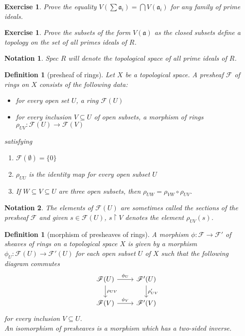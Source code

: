\documentclass[12pt]{article}
\newtheorem{definition}[proposition]{Definition}
\newtheorem{ex}[proposition]{Exercise}
\newtheorem{notation}{Notation}
\begin{document}
\begin{ex}
	Prove the equality $V(\sum \mathfrak{a}_i) = \bigcap V(\mathfrak{a}_i)$ for any family of prime ideals.
\end{ex}

\begin{ex}
	Prove the subsets of the form $V(\mathfrak{a})$ as the closed subsets define a topology on the set of all primes ideals of $R$. 
\end{ex}

\begin{notation}
	Spec $R$ will denote the topological space of all prime ideals of $R$.
\end{notation}

\begin{definition}[presheaf of rings]
	Let $X$ be a topological space. A presheaf $\mathscr{F}$ of rings on $X$ consists of the following data:
	\begin{itemize}
		\item for every open set $U$, a ring $\mathscr{F}(U)$
		\item for every inclusion $V \subseteq U$ of open subsets, a morphism of rings $\rho_{UV}: \mathscr{F}(U) \rightarrow \mathscr{F}(V)$  
	\end{itemize}
satisfying 
	\begin{enumerate}
		\item $\mathscr{F}(\emptyset) = \lbrace 0 \rbrace$
		\item $\rho_{UU}$ is the identity map for every open subset $U$
		\item  If $W \subseteq V \subseteq U$ are three open subsets, then $\rho_{UW} = \rho_{VW} \circ \rho_{UV}$.
	\end{enumerate}
\end{definition}

\begin{notation}
	The elements of $\mathscr{F}(U)$ are sometimes called the sections of the presheaf $\mathscr{F}$ and given $s \in \mathscr{F}(U)$, $s\restriction V$ denotes the element $\rho_{UV}(s)$.
\end{notation}

\begin{definition}[morphism of presheaves of rings]
	A morphism $\phi: \mathscr{F} \rightarrow \mathscr{F}'$ of sheaves of rings on a topological space $X$ is given by a morphism $\phi_U: \mathscr{F}(U) \rightarrow \mathscr{F}'(U)$ for each open subset $U$ of $X$ such that  the following diagram commutes
	\[
	\begin{tikzcd}
	\mathscr{F}(U) \arrow[r, "\phi_U"] \arrow[d, "\rho_{UV}"] & \mathscr{F}'(U) \arrow[d, "\rho'_{UV}"] \\
	\mathscr{F}(V) \arrow[r, "\phi_V"] & \mathscr{F}'(V) 
	\end{tikzcd}
	\]
	for every inclusion $V \subseteq U$. \\
	An isomorphism of presheaves is a morphism which has a two-sided inverse.
\end{definition}		
\end{document}
